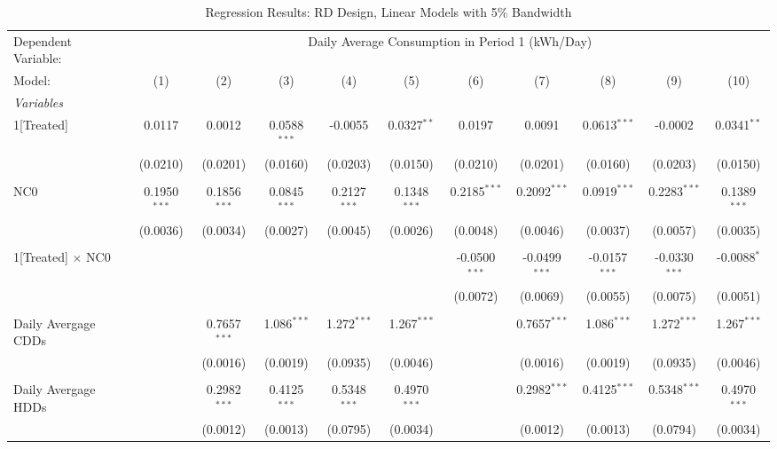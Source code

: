 \begin{table}[htbp]
\centering
\caption{\label{Table:Regression-Results_RD_Linear_BW-5} Regression Results: RD Design, Linear Models with 5\% Bandwidth}
\begin{adjustbox}{scale = 0.75}
\begin{tabular}{lcccccccccc}
\tabularnewline\toprule\toprule
Dependent Variable:&\multicolumn{10}{c}{Daily Average Consumption in Period 1 (kWh/Day)}\\
Model:&(1) & (2) & (3) & (4) & (5) & (6) & (7) & (8) & (9) & (10)\\
\midrule
\emph{Variables}&   &   &   &   &   &   &   &   &   &  \\
1[Treated]&0.0117 & 0.0012 & 0.0588$^{***}$ & -0.0055 & 0.0327$^{**}$ & 0.0197 & 0.0091 & 0.0613$^{***}$ & -0.0002 & 0.0341$^{**}$\\
  &(0.0210) & (0.0201) & (0.0160) & (0.0203) & (0.0150) & (0.0210) & (0.0201) & (0.0160) & (0.0203) & (0.0150)\\
& & & & & & & & & & \\
NC0&0.1950$^{***}$ & 0.1856$^{***}$ & 0.0845$^{***}$ & 0.2127$^{***}$ & 0.1348$^{***}$ & 0.2185$^{***}$ & 0.2092$^{***}$ & 0.0919$^{***}$ & 0.2283$^{***}$ & 0.1389$^{***}$\\
  &(0.0036) & (0.0034) & (0.0027) & (0.0045) & (0.0026) & (0.0048) & (0.0046) & (0.0037) & (0.0057) & (0.0035)\\
& & & & & & & & & & \\
1[Treated] $\times $ NC0&   &    &    &    &    & -0.0500$^{***}$ & -0.0499$^{***}$ & -0.0157$^{***}$ & -0.0330$^{***}$ & -0.0088$^{*}$\\
  &   &    &    &    &    & (0.0072) & (0.0069) & (0.0055) & (0.0075) & (0.0051)\\
& & & & & & & & & & \\
Daily Avergage CDDs&   & 0.7657$^{***}$ & 1.086$^{***}$ & 1.272$^{***}$ & 1.267$^{***}$ &    & 0.7657$^{***}$ & 1.086$^{***}$ & 1.272$^{***}$ & 1.267$^{***}$\\
  &   & (0.0016) & (0.0019) & (0.0935) & (0.0046) &    & (0.0016) & (0.0019) & (0.0935) & (0.0046)\\
& & & & & & & & & & \\
Daily Avergage HDDs&   & 0.2982$^{***}$ & 0.4125$^{***}$ & 0.5348$^{***}$ & 0.4970$^{***}$ &    & 0.2982$^{***}$ & 0.4125$^{***}$ & 0.5348$^{***}$ & 0.4970$^{***}$\\
  &   & (0.0012) & (0.0013) & (0.0795) & (0.0034) &    & (0.0012) & (0.0013) & (0.0794) & (0.0034)\\

\end{tabular}
\end{adjustbox}
\end{table}
